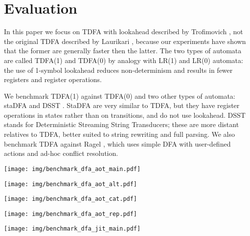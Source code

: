 \documentclass[]{article}
\begin{document}
\FloatBarrier

\section{Evaluation}\label{section_evaluation}

In this paper we focus on TDFA with lookahead described by Trofimovich \cite{Tro17},
not the original TDFA described by Laurikari \cite{Lau00},
because our experiments have shown that the former are generally faster then the latter.
The two types of automata are called TDFA(1) and TDFA(0) by analogy with LR(1) and LR(0) automata:
the use of 1-symbol lookahead reduces non-determinism and results in fewer registers and register operations.
\medskip

We benchmark TDFA(1) against TDFA(0) and two other types of automata: staDFA \cite{Cho18} and DSST \cite{Gra15}.
StaDFA are very similar to TDFA, but they have register operations in states rather than on transitions, and do not use lookahead.
DSST stands for Deterministic Streaming String Transducers; these are more distant relatives to TDFA,
better suited to string rewriting and full parsing.
We also benchmark TDFA against Ragel \cite{Ragel}, which uses simple DFA with user-defined actions and ad-hoc conflict resolution.
\medskip

\texttt{[image: img/benchmark\_dfa\_aot\_main.pdf]}
\label{fig:benchmark_dfa_aot_main}
\medskip

\texttt{[image: img/benchmark\_dfa\_aot\_alt.pdf]}
\label{fig:benchmark_dfa_aot_alt}
\medskip

\texttt{[image: img/benchmark\_dfa\_aot\_cat.pdf]}
\label{fig:benchmark_dfa_aot_cat}
\medskip

\texttt{[image: img/benchmark\_dfa\_aot\_rep.pdf]}
\label{fig:benchmark_dfa_aot_rep}
\medskip

\texttt{[image: img/benchmark\_dfa\_jit\_main.pdf]}
\label{fig:benchmark_dfa_jit_main}
\medskip
\end{document}
